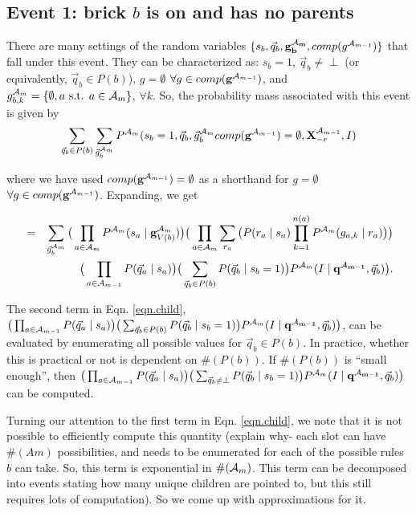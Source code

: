 \documentclass[11pt]{article}
\newcommand{\A}{{\cal A}}
\newcommand{\X}{\mathbf{X}}
\newcommand{\XrmPrev}{\X^{\A_{m-1}}_{-r}}
\newcommand{\Am}{\A_{m}}
\newcommand{\gcompPrev}{comp(\mathbf{g}^{\A_{m-1}})}
\newcommand{\qb}{\vec{q}_b}
\newcommand{\qa}{\vec{q}_a}
\begin{document}
\subsection*{Event 1: brick $b$ is on and has no parents}

There are many settings of the random variables $\{s_b, \qb, \mathbf{g^{\Am}_b}, comp(g^{\A_{m-1}})\}$ that fall under this event. They can be characterized as: $s_b=1$, $\qb \neq \perp$ (or equivalently, $\qb \in P(b)$), $g = \emptyset$ $\forall g \in \gcompPrev$, and $g^{\Am}_{b,k} = \{\emptyset, a \text{ s.t. } a \in {\Am}\}$, $\forall k$. So, the probability mass associated with this event is given by
\begin{eqnarray}
\sum_{\vec{q}_b \in P(b)} \sum_{\vec{g}^{\Am}_{b}} P^{\Am}(s_b=1, \vec{q}_b, \vec{g}^{\Am}_{b} \gcompPrev = \emptyset, \XrmPrev, I)
\end{eqnarray}

where we have used $\gcompPrev = \emptyset$ as a shorthand for $g = \emptyset$ $\forall g \in \gcompPrev$. Expanding, we get

\begin{eqnarray}
&=& \sum_{\vec{g}^{\Am}_{b}} \big( \prod_{a \in {\Am}} P^{\Am}(s_a \mid \mathbf{g}^{\Am}_{V({b})}) \big ) \big( \prod_{a \in {\A_{m}}} \sum_{r_a} \big(P(r_a \mid s_a) \prod_{k=1}^{n(a)} P^{\Am}(g_{a,k} \mid r_a) \big) \big) \label{eqn.child} \\
%
& & \big( \prod_{a \in {\A_{m-1}}} P(\qa \mid s_a)\big) \big( \sum_{\vec{q}_b \in P(b)} P(\qb \mid s_b = 1)\big) P^{\Am}(I \mid \mathbf{q^{\A_{m-1}}}, \vec{q}_b) \big). \nonumber
\end{eqnarray}

The second term in Eqn. \ref{eqn.child}, $\big( \prod_{a \in {\A_{m-1}}} P(\qa \mid s_a)\big) \big( \sum_{\vec{q}_b \in P(b)} P(\qb \mid s_b = 1)\big) P^{\Am}(I \mid \mathbf{q^{\A_{m-1}}}, \vec{q}_b) \big)$, can be evaluated by enumerating all possible values for $\vec{q}_b \in P(b)$. In practice, whether this is practical or not is dependent on $\#(P(b))$. If $\#(P(b))$ is ``small enough'', then $\big( \prod_{a \in {\A_{m-1}}} P(\qa \mid s_a)\big) \big( \sum_{\vec{q}_b \neq \perp} P(\qb \mid s_b = 1)\big) P^{\Am}(I \mid \mathbf{q^{\A_{m-1}}}, \vec{q}_b) \big)$ can be computed. 

Turning our attention to the first term in Eqn. \ref{eqn.child}, we note that it is not possible to efficiently compute this quantity (explain why- each slot can have $\#(Am)$ possibilities, and needs to be enumerated for each of the possible rules $b$ can take. So, this term is exponential in $\#(\Am)$. This term can be decomposed into events stating how many unique children are pointed to, but this still requires lots of computation). So we come up with approximations for it.
\end{document}
